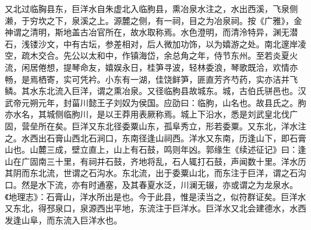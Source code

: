 \documentclass[12pt,UTF8]{ctexbook}
\begin{document}
又北过临胸县东，巨洋水自朱虚北入临朐县，熏冶泉水注之，水出西溪，飞泉侧濑，于穷坎之下，泉溪之上。源麓之侧，有一祠，目之为冶泉祠。按《广雅》，金神谓之清明，斯地盖古冶官所在，故水取称焉。水色澄明，而清泠特异，渊无潜石，浅镂沙文，中有古坛，参差相对，后人微加功饰，以为嬉游之处。南北邃岸凌空，疏木交合。先公以太和中，作镇海岱，余总角之年，侍节东州。至若炎夏火流，闲居倦想，提琴命友，嬉娱永日，桂笋寻波，轻林委浪，琴歌既洽，欢情亦畅，是焉栖寄，实可凭衿。小东有一湖，佳饶鲜笋，匪直芳齐芍药，实亦洁并飞鳞。其水东北流入巨洋，谓之熏冶泉。又径临朐县故城东。城，古伯氏骈邑也。汉武帝元朔元年，封菑川懿王子刘奴为侯国。应劭曰：临朐，山名也。故县氏之。朐亦水名，其城侧临朐川，是以王莽用表厥称焉。城上下沿水，悉是刘武皇北伐广固，营垒所在矣。巨洋又东北径委粟山东，孤阜秀立，形若委粟。又东北，洋水注之。水西出石膏山西北石涧口，东南径逢山祠西。洋水又东南，历逢山下，即石膏山也。山麓三成，壁立直上，山上有石鼓，鸣则年凶。郭缘生《续述征记》曰：逢山在广固南三十里，有祠并石鼓，齐地将乱，石人辄打石鼓，声闻数十里。洋水历其阴而东北流，世谓之石沟水。东北流，出于委粟山北，而东注于巨洋，谓之石沟口。然是水下流，亦有时通塞，及其春夏水泛，川澜无辍，亦或谓之为龙泉水。《地理志》：石膏山，洋水所出是也。今于此县，惟是渎当之，似符群证矣。巨洋水又东北，得邳泉口，泉源西出平地，东流注于巨洋水。巨洋水又北会建德水，水西发逢山阜，而东流入巨洋水也。
\end{document}
